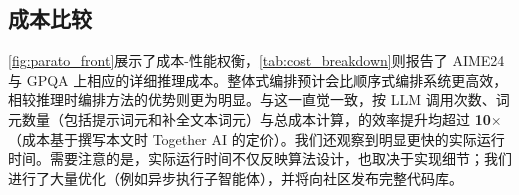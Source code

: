 

\subsection{成本比较}
\label{ap:cost_breakdown}



\cref{fig:parato_front}展示了成本-性能权衡，\cref{tab:cost_breakdown}则报告了 AIME24 与 GPQA 上相应的详细推理成本。整体式编排预计会比顺序式编排系统更高效，相较推理时编排方法的优势则更为明显。与这一直觉一致，按 LLM 调用次数、词元数量（包括提示词元和补全文本词元）与总成本计算，\ourframework 的效率提升均超过 \textbf{10$\times$}（成本基于撰写本文时 Together AI 的定价）。我们还观察到明显更快的实际运行时间。需要注意的是，实际运行时间不仅反映算法设计，也取决于实现细节；我们进行了大量优化（例如异步执行子智能体），并将向社区发布完整代码库。




